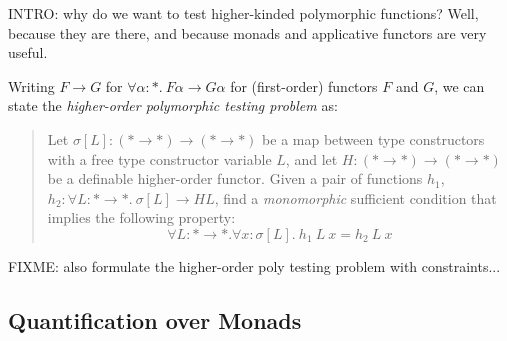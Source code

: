 \documentclass{llncs}
\begin{document}
INTRO: why do we want to test higher-kinded polymorphic functions?
Well, because they are there, and because monads and applicative
functors are very useful.

Writing $F \rightarrow G$ for $\forall \alpha : *.\ F \alpha
\rightarrow G \alpha$ for (first-order) functors $F$ and $G$, we can
state the {\em higher-order polymorphic testing problem} as:

\begin{verse}\label{problem:hpoly-testing}
  \hspace*{0.2in}Let $\sigma[L] : (* \rightarrow *) \rightarrow (*
  \rightarrow *)$ be a map between type constructors with a free type
  constructor variable $L$, and let $H : (* \rightarrow *) \rightarrow
  (* \rightarrow *)$ be a definable higher-order functor. Given a pair
  of functions $h_1$, $h_2 : \forall L: * \rightarrow *.\ \sigma[L]
  \rightarrow HL$, find a \emph{monomorphic} sufficient condition that
  implies the following property:
  \begin{equation}
    \label{eq:hproblem}
    \forall L : * \rightarrow *. \forall x : \sigma[L].~h_1~L~x = h_2~L~x
  \end{equation}
\end{verse}

FIXME: also formulate the higher-order poly testing problem with
constraints...



\subsection{Quantification over Monads}

\end{document}
